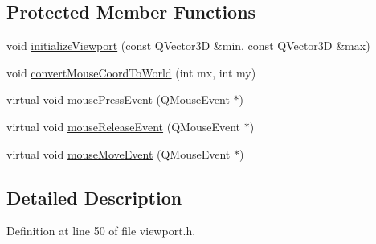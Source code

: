 \subsection*{Protected Member Functions}
\begin{DoxyCompactItemize}
\item 
void \hyperlink{classShipCADGeometry_1_1Viewport_acef72369540d8e4d479eeadf5fdc3674}{initialize\-Viewport} (const Q\-Vector3\-D \&min, const Q\-Vector3\-D \&max)
\item 
void \hyperlink{classShipCADGeometry_1_1Viewport_a64a528202f47e6b10402f3aac161f85a}{convert\-Mouse\-Coord\-To\-World} (int mx, int my)
\item 
virtual void \hyperlink{classShipCADGeometry_1_1Viewport_a0dddc5b05c7308f8818a726b16a7d9eb}{mouse\-Press\-Event} (Q\-Mouse\-Event $\ast$)
\item 
virtual void \hyperlink{classShipCADGeometry_1_1Viewport_a7cb6994a92d40990b58be272953b9120}{mouse\-Release\-Event} (Q\-Mouse\-Event $\ast$)
\item 
virtual void \hyperlink{classShipCADGeometry_1_1Viewport_ab98dde7bb1d923b8cfc9a0c3cb249c2c}{mouse\-Move\-Event} (Q\-Mouse\-Event $\ast$)
\end{DoxyCompactItemize}


\subsection{Detailed Description}


Definition at line 50 of file viewport.\-h.



